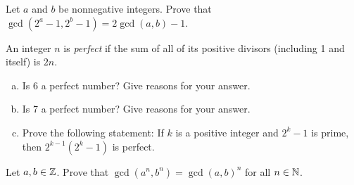 \question Let $a$ and $b$ be nonnegative integers.
Prove that $\gcd(2^a - 1, 2^b - 1) = 2\gcd(a,b) - 1$.

\question An integer $n$ is \emph{perfect} if the sum of all of its positive divisors
(including 1 and itself) is $2n$.
\begin{enumerate}[(a)]
  \item Is 6 a perfect number? Give reasons for your answer.
  \item Is 7 a perfect number? Give reasons for your answer.
  \item Prove the following statement:
        If $k$ is a positive integer and $2^k-1$ is prime, then $2^{k-1}(2^k-1)$ is perfect.
\end{enumerate}

\question Let $a,b\in\mathbb{Z}$. Prove that $\gcd(a^n, b^n) = \gcd(a, b)^n$ for all $n\in\mathbb{N}$.

